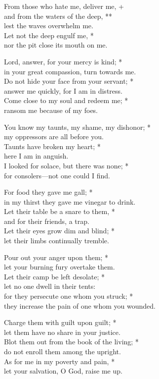 From those who hate me, deliver me, +\\
and from the waters of the deep, **\\
lest the waves overwhelm me. \\
Let not the deep engulf me, *\\
nor the pit close its mouth on me.

Lord, answer, for your mercy is kind; *\\
in your great compassion, turn towards me. \\
Do not hide your face from your servant; *\\
answer me quickly, for I am in distress. \\
Come close to my soul and redeem me; *\\
ransom me because of my foes.

You know my taunts, my shame, my dishonor; *\\
my oppressors are all before you. \\
Taunts have broken my heart; *\\
here I am in anguish. \\
I looked for solace, but there was none; *\\
for consolers—not one could I find.

For food they gave me gall; *\\
in my thirst they gave me vinegar to drink. \\
Let their table be a snare to them, *\\
and for their friends, a trap. \\
Let their eyes grow dim and blind; *\\
let their limbs continually tremble.

Pour out your anger upon them; *\\
let your burning fury overtake them. \\
Let their camp be left desolate; *\\
let no one dwell in their tents: \\
for they persecute one whom you struck; *\\
they increase the pain of one whom you wounded.

Charge them with guilt upon guilt; *\\
let them have no share in your justice. \\
Blot them out from the book of the living; *\\
do not enroll them among the upright. \\
As for me in my poverty and pain, *\\
let your salvation, O God, raise me up. 

